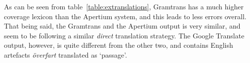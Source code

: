 \documentclass[11pt]{article}
\begin{document}
As can be seen from table~\ref{table:extranslations}, Gramtrans has a much higher coverage lexicon 
than the Apertium system, and this leads to less errors overall. That being said, the Gramtrans
and the Apertium output is very similar, and seem to be following a similar \emph{direct} translation strategy. The 
Google Translate output, however, is quite different from the other two, and contains English 
artefacts \emph{överfart} translated as `passage'. 




\end{document}
